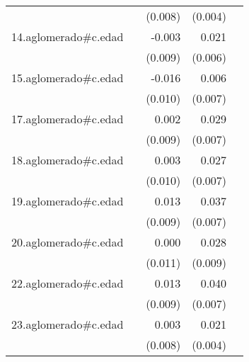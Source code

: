 {\begin{longtable}{l*{4}{D{.}{.}{-1}}}
            &                     &     (0.008)         &     (0.004)         &                     \\
\addlinespace
14.aglomerado#c.edad&                     &      -0.003         &       0.021\sym{***}&                     \\
            &                     &     (0.009)         &     (0.006)         &                     \\
\addlinespace
15.aglomerado#c.edad&                     &      -0.016         &       0.006         &                     \\
            &                     &     (0.010)         &     (0.007)         &                     \\
\addlinespace
17.aglomerado#c.edad&                     &       0.002         &       0.029\sym{***}&                     \\
            &                     &     (0.009)         &     (0.007)         &                     \\
\addlinespace
18.aglomerado#c.edad&                     &       0.003         &       0.027\sym{***}&                     \\
            &                     &     (0.010)         &     (0.007)         &                     \\
\addlinespace
19.aglomerado#c.edad&                     &       0.013         &       0.037\sym{***}&                     \\
            &                     &     (0.009)         &     (0.007)         &                     \\
\addlinespace
20.aglomerado#c.edad&                     &       0.000         &       0.028\sym{**} &                     \\
            &                     &     (0.011)         &     (0.009)         &                     \\
\addlinespace
22.aglomerado#c.edad&                     &       0.013         &       0.040\sym{***}&                     \\
            &                     &     (0.009)         &     (0.007)         &                     \\
\addlinespace
23.aglomerado#c.edad&                     &       0.003         &       0.021\sym{***}&                     \\
            &                     &     (0.008)         &     (0.004)         &                     \\

\end{longtable}}
